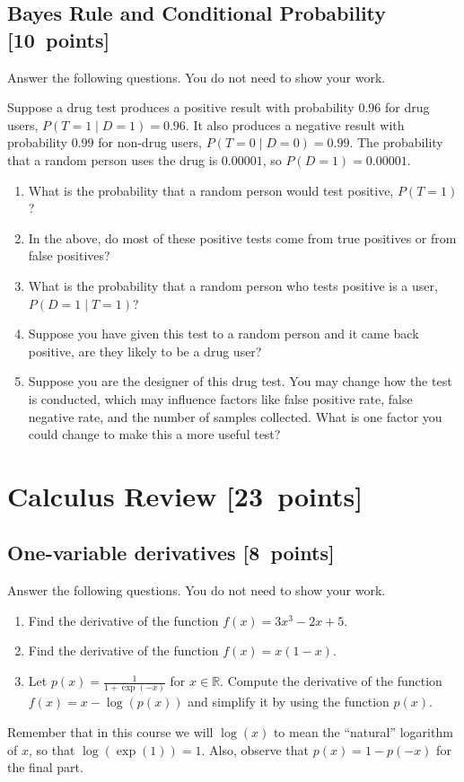 \documentclass{article}
\newcommand{\blu}[1]{{\textcolor{blu}{#1}}}
\let\ask\blu
\newcommand\pts[1]{\textcolor{pointscolour}{[#1~points]}}
\def\R{\mathbb{R}}
\begin{document}
  \subsection{Bayes Rule and Conditional Probability \pts{10}}

  \ask{Answer the following questions.} You do not need to show your work.

  Suppose a drug test produces a positive result with probability $0.96$ for drug users, $P(T=1 \mid D=1)=0.96$. It also produces a negative result with probability $0.99$ for non-drug users, $P(T=0 \mid D=0)=0.99$. The probability that a random person uses the drug is $0.00001$, so $P(D=1)=0.00001$.

  \begin{enumerate}
  \item What is the probability that a random person would test positive, $P(T=1)$?
  
  \item In the above, do most of these positive tests come from true positives or from false positives?
  \item What is the probability that a random person who tests positive is a user, $P(D=1 \mid T=1)$?
  
  \item Suppose you have given this test to a random person and it came back positive, are they likely to be a drug user?
  \item Suppose you are the designer of this drug test. You may change how the test is conducted, which may influence factors like false positive rate, false negative rate, and the number of samples collected. What is one factor you could change to make this a more useful test?
  \end{enumerate}


  \clearpage\section{Calculus Review \pts{23}}



  \subsection{One-variable derivatives \pts{8}}
  \label{sub.one.var}

  \ask{Answer the following questions.} You do not need to show your work.

  \begin{enumerate}
  \item Find the derivative of the function $f(x) = 3x^3 -2x + 5$.
  \item Find the derivative of the function $f(x) = x(1-x)$.
  \item Let $p(x) = \frac{1}{1+\exp(-x)}$ for $x \in \R$. Compute the derivative of the function $f(x) = x-\log(p(x))$ and simplify it by using the function $p(x)$.
  
  \end{enumerate}
  Remember that in this course we will $\log(x)$ to mean the ``natural'' logarithm of $x$, so that $\log(\exp(1)) = 1$. Also, observe that $p(x) = 1-p(-x)$ for the final part.
\end{document}
